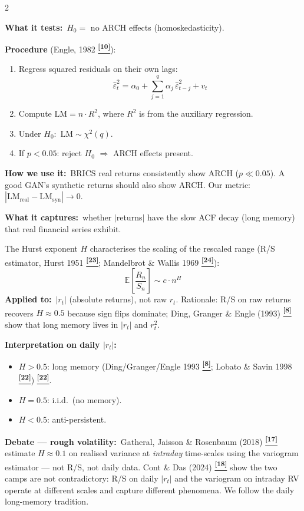 \documentclass[10pt]{article}
\newcommand{\redbox}[2]{\begin{tcolorbox}[mybox={DRed}{RBg},title={#1}]#2\end{tcolorbox}}
\newcommand{\purplebox}[2]{\begin{tcolorbox}[mybox={Purple}{LBg},title={#1}]#2\end{tcolorbox}}
\newcommand{\tcite}[1]{%
  \hyperlink{R:#1}{\textsuperscript{\scriptsize\textbf{[#1]}}}}
\newcommand{\E}{\mathbb{E}}
\begin{document}
\begin{multicols}{2}

\redbox{1.\ ARCH-LM Test --- Volatility Clustering}{%
\textbf{What it tests:}\ $H_0 =$ no ARCH effects (homoskedasticity).

\textbf{Procedure} (Engle, 1982\tcite{10}):
\begin{enumerate}
  \item Regress squared residuals on their own lags:
        \[\hat{\varepsilon}^2_t = \alpha_0 + \sum_{j=1}^q \alpha_j\,\hat{\varepsilon}^2_{t-j} + v_t\]
  \item Compute $\text{LM} = n \cdot R^2$, where $R^2$ is from the auxiliary regression.
  \item Under $H_0$:\ $\text{LM} \sim \chi^2(q)$.
  \item If $p < 0.05$: reject $H_0$ $\Rightarrow$ ARCH effects present.
\end{enumerate}

\textbf{How we use it:}\ BRICS real returns consistently show ARCH ($p \ll 0.05$). A good GAN's synthetic returns should also show ARCH. Our metric: $|\text{LM}_\text{real} - \text{LM}_\text{syn}| \to 0$.}

\purplebox{2.\ Hurst Exponent --- Long Memory (with roughness caveat)}{%
\textbf{What it captures:}\ whether $|$returns$|$ have the slow ACF decay (long memory) that real financial series exhibit.

The Hurst exponent $H$ characterises the scaling of the rescaled range (R/S estimator, Hurst 1951\tcite{23}; Mandelbrot \& Wallis 1969\tcite{24}):
\begin{equation*}
  \E\!\left[\frac{R_n}{S_n}\right] \sim c \cdot n^H
\end{equation*}
\textbf{Applied to:}\ $|r_t|$ (absolute returns), not raw $r_t$.
Rationale: R/S on raw returns recovers $H\approx0.5$ because sign flips dominate;
Ding, Granger \& Engle (1993)\tcite{8} show that long memory lives in $|r_t|$ and $r_t^2$.

\textbf{Interpretation on daily $|r_t|$:}
\begin{itemize}
  \item $H > 0.5$: long memory (Ding/Granger/Engle 1993\tcite{8}; Lobato \& Savin 1998\tcite{22})\tcite{22}.
  \item $H = 0.5$: i.i.d.\ (no memory).
  \item $H < 0.5$: anti-persistent.
\end{itemize}

\textbf{Debate --- rough volatility:}\ Gatheral, Jaisson \& Rosenbaum (2018)\tcite{17} estimate $H \approx 0.1$ on realised variance at \emph{intraday} time-scales using the variogram estimator --- not R/S, not daily data.
Cont \& Das (2024)\tcite{18} show the two camps are not contradictory: R/S on daily $|r_t|$ and the variogram on intraday RV operate at different scales and capture different phenomena. We follow the daily long-memory tradition.

}
\end{multicols}
\end{document}
